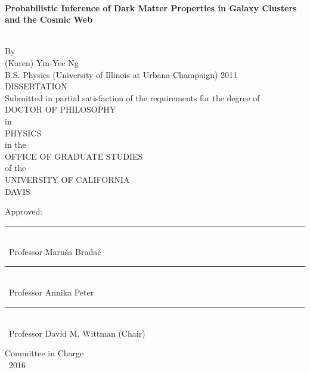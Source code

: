 \singlespacing

~\vspace{-0.5in} %
\begin{center}

  \begin{large}
    {\bf Probabilistic Inference of Dark Matter Properties in Galaxy Clusters
		and the Cosmic Web}
  \end{large}\\\n
  By\\\n
  {\sc (Karen) Yin-Yee Ng}\\
  B.S. Physics (University of Illinois at Urbana-Champaign) 2011\\
  DISSERTATION\\\n
  Submitted in partial satisfaction of the requirements for the degree of\\\n
  DOCTOR OF PHILOSOPHY\\\n
  in\\\n
  PHYSICS\\\n
  in the\\\n
  OFFICE OF GRADUATE STUDIES\\\n
  of the\\\n
  UNIVERSITY OF CALIFORNIA\\\n
  DAVIS\\\n\n
  
  Approved:\\\n\n
  
  \rule{4in}{1pt}\\
  ~Professor Maru{\v s}a Brada{\v c}\\ \n\n

  \rule{4in}{1pt}\\
  ~Professor Annika Peter\\\n\n


  \rule{4in}{1pt}\\
  ~Professor David M. Wittman (Chair)\\ \n\n

  \vfill
  
  Committee in Charge\\
  ~2016
  
\end{center}

